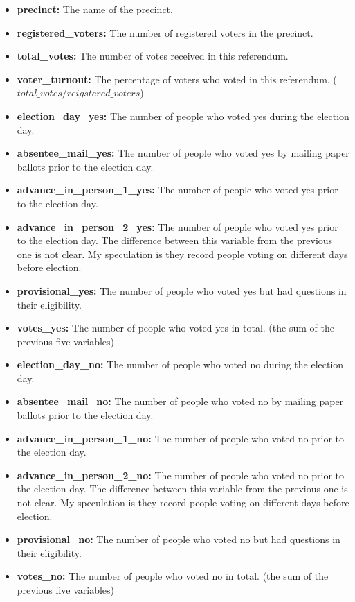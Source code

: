 \documentclass[
]{article}
\providecommand{\tightlist}{%
  \setlength{\itemsep}{0pt}\setlength{\parskip}{0pt}}
\begin{document}
\begin{itemize}
\tightlist
\item
  \textbf{precinct:} The name of the precinct.
\item
  \textbf{registered\_voters:} The number of registered voters in the
  precinct.
\item
  \textbf{total\_votes:} The number of votes received in this
  referendum.
\item
  \textbf{voter\_turnout:} The percentage of voters who voted in this
  referendum. (\(total\_votes/reigstered\_voters\))
\item
  \textbf{election\_day\_yes:} The number of people who voted yes during
  the election day.
\item
  \textbf{absentee\_mail\_yes:} The number of people who voted yes by
  mailing paper ballots prior to the election day.
\item
  \textbf{advance\_in\_person\_1\_yes:} The number of people who voted
  yes prior to the election day.
\item
  \textbf{advance\_in\_person\_2\_yes:} The number of people who voted
  yes prior to the election day. The difference between this variable
  from the previous one is not clear. My speculation is they record
  people voting on different days before election.
\item
  \textbf{provisional\_yes:} The number of people who voted yes but had
  questions in their eligibility.
\item
  \textbf{votes\_yes:} The number of people who voted yes in total. (the
  sum of the previous five variables)
\item
  \textbf{election\_day\_no:} The number of people who voted no during
  the election day.
\item
  \textbf{absentee\_mail\_no:} The number of people who voted no by
  mailing paper ballots prior to the election day.
\item
  \textbf{advance\_in\_person\_1\_no:} The number of people who voted no
  prior to the election day.
\item
  \textbf{advance\_in\_person\_2\_no:} The number of people who voted no
  prior to the election day. The difference between this variable from
  the previous one is not clear. My speculation is they record people
  voting on different days before election.
\item
  \textbf{provisional\_no:} The number of people who voted no but had
  questions in their eligibility.
\item
  \textbf{votes\_no:} The number of people who voted no in total. (the
  sum of the previous five variables)
\end{itemize}
\end{document}
